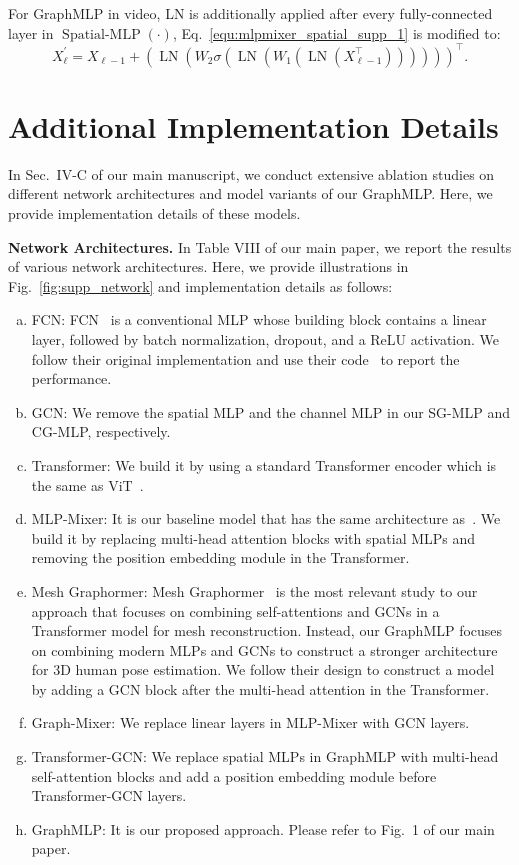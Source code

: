 \documentclass[lettersize,journal]{IEEEtran}
\begin{document}
For GraphMLP in video, LN is additionally applied after every fully-connected layer in $\operatorname{Spatial-MLP}(\cdot)$, Eq.~\eqref{equ:mlpmixer_spatial_supp_1} is modified to:
\begin{equation}
  X^{\prime}_{\ell} = X_{\ell-1} + \left(\operatorname{LN}\left(W_{2} \sigma\left(\operatorname{LN}\left(W_{1}(\operatorname{LN}(X_{\ell-1}^{\top}))\right)\right)\right)\right)^{\top}. 
\end{equation}

\section{Additional Implementation Details}
\label{sec:details}
In Sec.~IV-C of our main manuscript, we conduct extensive ablation studies on different network architectures and model variants of our GraphMLP. 
Here, we provide implementation details of these models. 

\noindent \textbf{Network Architectures.}
In Table VIII of our main paper, we report the results of various network architectures. 
Here, we provide illustrations in Fig.~\ref{fig:supp_network} and implementation details as follows:
\begin{enumerate}[(a)]
  \item FCN: FCN~\cite{simplebaseline} is a conventional MLP whose building block contains a linear layer, followed by batch normalization, dropout, and a ReLU activation. 
  We follow their original implementation and use their code~\cite{code_baeline} to report the performance. 
  \item GCN: We remove the spatial MLP and the channel MLP in our SG-MLP and CG-MLP, respectively. 
  \item Transformer: We build it by using a standard Transformer encoder which is the same as ViT~\cite{vit}. 
  \item MLP-Mixer: It is our baseline model that has the same architecture as~\cite{mlpmixer}. We build it by replacing multi-head attention blocks with spatial MLPs and removing the position embedding module in the Transformer. 
  \item Mesh Graphormer: Mesh Graphormer~\cite{meshgraphormer} is the most relevant study to our approach that focuses on combining self-attentions and GCNs in a Transformer model for mesh reconstruction. 
  Instead, our GraphMLP focuses on combining modern MLPs and GCNs to construct a stronger architecture for 3D human pose estimation. 
  We follow their design to construct a model by adding a GCN block after the multi-head attention in the Transformer. 
  \item Graph-Mixer: We replace linear layers in MLP-Mixer with GCN layers. 
  \item Transformer-GCN: We replace spatial MLPs in GraphMLP with multi-head self-attention blocks and add a position embedding module before Transformer-GCN layers. 
  \item GraphMLP: It is our proposed approach. Please refer to Fig.~1 of our main paper. 
\end{enumerate}
\end{document}
